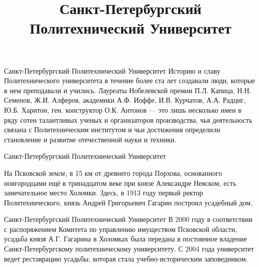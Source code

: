 \documentclass[xcolor=dvipsnames,12pt]{beamer}
\begin{document}
\title{Санкт-Петербургский Политехнический Университет}
\date{}

\begin{frame}[plain] 
\titlepage
\end{frame}

\begin{frame}{Санкт-Петербургский Политехнический Университет}
Историю и славу Политехнического университета в течение более ста лет создавали люди, которые в нем преподавали и учились. Лауреаты Нобелевской премии П.Л. Капица, Н.Н. Семенов, Ж.И. Алферов, академики А.Ф. Иоффе, И.В. Курчатов, А.А. Радциг, Ю.Б. Харитон, ген. конструктор О.К. Антонов — это лишь несколько имен в ряду сотен талантливых ученых и организаторов производства, чья деятельность связана с Политехническим институтом и чьи достижения определили становление и развитие отечественной науки и техники.
\end{frame}

\begin{frame}{Санкт-Петербургский Политехнический Университет}

\begin{center}
\end{center}

На Псковской земле, в 15 км от древнего города Порхова, основанного новгородцами ещё в тринадцатом веке при князе Александре Невском, есть замечательное место Холомки. Здесь, в 1913 году первый ректор Политехнического, князь Андрей Григорьевич Гагарин построил усадебный дом. 
\end{frame}

\begin{frame}{Санкт-Петербургский Политехнический Университет}
В 2000 году в соответствии с распоряжением Комитета по управлению имуществом Псковской области, усадьба князя А.Г. Гагарина в Холомках была передана в постоянное владение Санкт-Петербургскому политехническому университету. С 2004 года университет ведет реставрацию усадьбы, которая стала учебно-историческим заповедником.
\end{frame}
\end{document}
